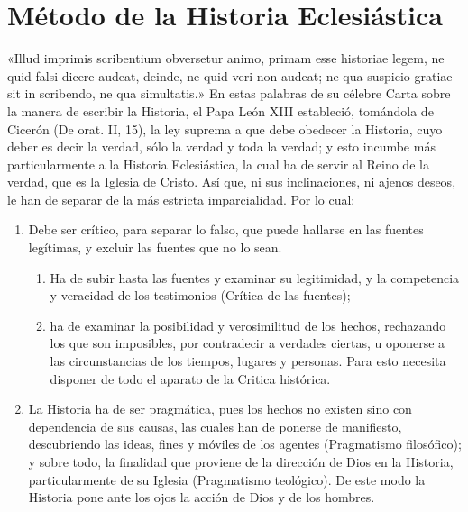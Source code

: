\raggedbottom{} \documentclass[12pt, a4paper, openany]{book} %
\begin{document}
\section{Método de la Historia Eclesiástica}
«Illud imprimis scribentium obversetur animo, primam esse historiae legem, ne quid falsi dicere audeat, deinde, ne quid veri non audeat; ne qua suspicio gratiae sit in scribendo, ne qua simultatis.» En estas palabras de su célebre Carta sobre la manera de escribir la Historia, el Papa León XIII estableció, tomándola de Cicerón (De orat. II, 15), la ley suprema a que debe obedecer la Historia, cuyo deber es decir la verdad, sólo la verdad y toda la verdad; y esto incumbe más particularmente a la Historia Eclesiástica, la cual ha de servir al Reino de la verdad, que es la Iglesia de Cristo. Así que, ni sus inclinaciones, ni ajenos deseos, le han de separar de la más estricta imparcialidad. Por lo cual: \begin{enumerate}
  \item Debe ser crítico, para separar lo falso, que puede hallarse en las fuentes legítimas, y excluir las fuentes que no lo sean.\begin{enumerate}
          \item Ha de subir hasta las fuentes y examinar su legitimidad, y la competencia y veracidad de los testimonios (Crítica de las fuentes);
          \item ha de examinar la posibilidad y verosimilitud de los hechos, rechazando los que son imposibles, por contradecir a verdades ciertas, u oponerse a las circunstancias de los tiempos, lugares y personas. Para esto necesita disponer de todo el aparato de la Critica histórica.
        \end{enumerate}
  \item La Historia ha de ser pragmática, pues los hechos no existen sino con dependencia de sus causas, las cuales han de ponerse de manifiesto, descubriendo las ideas, fines y móviles de los agentes (Pragmatismo filosófico); y sobre todo, la finalidad que proviene de la dirección de Dios en la Historia, particularmente de su Iglesia (Pragmatismo teológico). De este modo la Historia pone ante los ojos la acción de Dios y de los hombres.
\end{enumerate}
\end{document}
